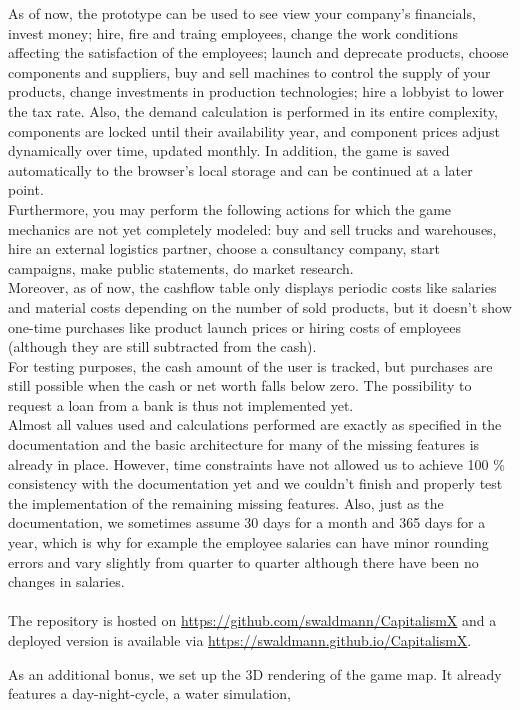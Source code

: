   As of now, the prototype can be used to see view your company's financials, invest money; hire, fire and traing employees, change the work conditions affecting the satisfaction of the employees; launch and deprecate products, choose components and suppliers, buy and sell machines to control the supply of your products, change investments in production technologies; hire a lobbyist to lower the tax rate. Also, the demand calculation is performed in its entire complexity, components are locked until their availability year, and component prices adjust dynamically over time, updated monthly. In addition, the game is saved automatically to the browser's local storage and can be continued at a later point.\\
  
  Furthermore, you may perform the following actions for which the game mechanics are not yet completely modeled: buy and sell trucks and warehouses, hire an external logistics partner, choose a consultancy company, start campaigns, make public statements, do market research.\\
  
  Moreover, as of now, the cashflow table only displays periodic costs like salaries and material costs depending on the number of sold products, but it doesn't show one-time purchases like product launch prices or hiring costs of employees (although they are still subtracted from the cash).\\
  
  For testing purposes, the cash amount of the user is tracked, but purchases are still possible when the cash or net worth falls below zero. The possibility to request a loan from a bank is thus not implemented yet.\\
 
Almost all values used and calculations performed are exactly as specified in the documentation and the basic architecture for many of the missing features is already in place. However, time constraints have not allowed us to achieve 100 \% consistency with the documentation yet and we couldn't finish and properly test the implementation of the remaining missing features. Also, just as the documentation, we sometimes assume 30 days for a month and 365 days for a year, which is why for example the employee salaries can have minor rounding errors and vary slightly from quarter to quarter although there have been no changes in salaries.\\\\
The repository is hosted on \href{https://github.com/swaldmann/CapitalismX}{https://github.com/swaldmann/CapitalismX} and a deployed version is available via \href{https://swaldmann.github.io/CapitalismX}{https://swaldmann.github.io/CapitalismX}.

As an additional bonus, we set up the 3D rendering of the game map. It already features a day-night-cycle, a water simulation, 